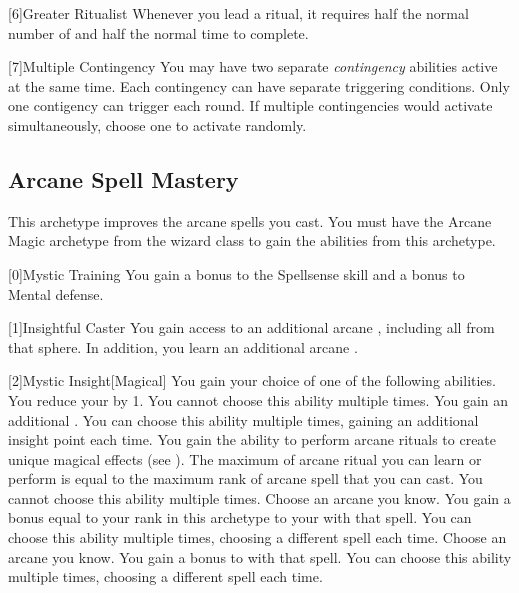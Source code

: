         [6]{Greater Ritualist} Whenever you lead a ritual, it requires half the normal number of  and half the normal time to complete.

        [7]{Multiple Contingency} You may have two separate \textit{contingency} abilities active at the same time.
        Each contingency can have separate triggering conditions.
        Only one contigency can trigger each round.
        If multiple contingencies would activate simultaneously, choose one to activate randomly.

    \newpage
    \subsection{Arcane Spell Mastery}
        This archetype improves the arcane spells you cast.
        You must have the Arcane Magic archetype from the wizard class to gain the abilities from this archetype.

        [0]{Mystic Training} You gain a  bonus to the Spellsense skill and a  bonus to Mental defense.

        [1]{Insightful Caster} You gain access to an additional arcane , including all  from that sphere.
        In addition, you learn an additional arcane .

        [2]{Mystic Insight}[Magical]
        You gain your choice of one of the following abilities.
        {
             You reduce your  by 1.
                You cannot choose this ability multiple times.
             You gain an additional .
                You can choose this ability multiple times, gaining an additional insight point each time.
             You gain the ability to perform arcane rituals to create unique magical effects (see ).
                The maximum  of arcane ritual you can learn or perform is equal to the maximum rank of arcane spell that you can cast.
                You cannot choose this ability multiple times.
             Choose an arcane  you know.
                You gain a bonus equal to your rank in this archetype to your  with that spell.
                You can choose this ability multiple times, choosing a different spell each time.
             Choose an arcane  you know.
                You gain a  bonus to  with that spell.
                You can choose this ability multiple times, choosing a different spell each time.
        }

